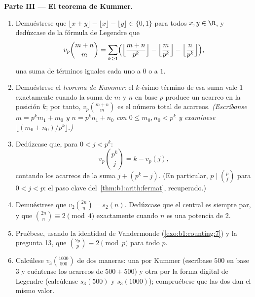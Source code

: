 \begin{problem}
\medskip
\noindent\textbf{Parte III --- El teorema de Kummer.}
\begin{enumerate}[resume]
  \item Demuéstrese que $\lfloor x + y \rfloor - \lfloor x \rfloor -
        \lfloor y \rfloor \in \{0, 1\}$ para todos $x, y \in \R$, y
        dedúzcase de la fórmula de Legendre que
        \[
        v_p\binom{m+n}m
        = \sum_{k\geq1}\Bigl(
        \Bigl\lfloor\frac{m+n}{p^k}\Bigr\rfloor
        - \Bigl\lfloor\frac{m}{p^k}\Bigr\rfloor
        - \Bigl\lfloor\frac{n}{p^k}\Bigr\rfloor\Bigr),
        \]
        una suma de términos iguales cada uno a $0$ o a $1$.
  \item Demuéstrese el \emph{teorema de Kummer}: el $k$-ésimo término
        de esa suma vale $1$ exactamente cuando la suma de $m$ y $n$
        en base $p$ produce un acarreo en la posición $k$; por tanto,
        $v_p\binom{m+n}m$ es el número total de acarreos.
        \emph{(Escríbanse $m = p^km_1 + m_0$ y $n = p^kn_1 + n_0$ con
        $0 \leq m_0, n_0 < p^k$ y examínese $\lfloor (m_0 +
        n_0)/p^k \rfloor$.)}
  \item Dedúzcase que, para $0 < j < p^k$:
        \[
        v_p\binom{p^k}{j} = k - v_p(j) ,
        \]
        contando los acarreos de la suma $j + (p^k - j)$. (En
        particular, $p \mid \binom p j$ para $0 < j < p$: el paso
        clave del~\cref{thm:b1:arith:fermat}, recuperado.)
  \item Demuéstrese que $v_2\binom{2n}n = s_2(n)$. Dedúzcase que el
         central es siempre par, y que
        $\binom{2n}n \equiv 2 \pmod 4$ exactamente cuando $n$ es una
        potencia de $2$.
  \item Pruébese, usando la identidad de Vandermonde
        (\cref{exo:b1:counting:7}) y la pregunta 13, que
        $\binom{2p}p \equiv 2 \pmod p$ para todo  $p$.
  \item Calcúlese $v_3\binom{1000}{500}$ de dos maneras: una por
        Kummer (escríbase $500$ en base $3$ y cuéntense los acarreos
        de $500 + 500$) y otra por la forma digital de Legendre
        (calcúlense $s_3(500)$ y $s_3(1000)$); compruébese que las dos
        dan el mismo valor.
\end{enumerate}


\end{problem}
